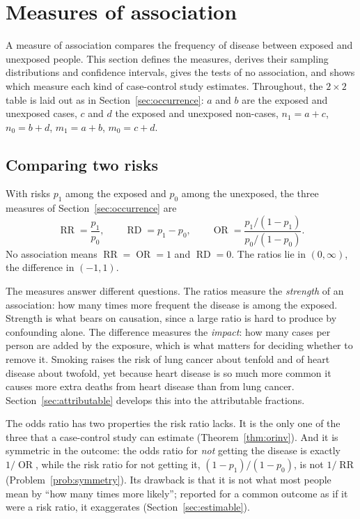 \documentclass[11pt,a4paper]{article}
\numberwithin{equation}{section}
\DeclareMathOperator{\OR}{OR}
\DeclareMathOperator{\RR}{RR}
\DeclareMathOperator{\RD}{RD}
\theoremstyle{definition}
\begin{document}
\section{Measures of association}
\label{sec:association}

A measure of association compares the frequency of disease between exposed and unexposed people. This section defines the measures,
derives their sampling distributions and confidence intervals, gives the tests of no association, and shows which measure each kind of
case-control study estimates. Throughout, the $2 \times 2$ table is laid out as in Section~\ref{sec:occurrence}: $a$ and $b$ are the exposed and
unexposed cases, $c$ and $d$ the exposed and unexposed non-cases, $n_1 = a + c$, $n_0 = b + d$, $m_1 = a + b$, $m_0 = c + d$.

\subsection{Comparing two risks}

With risks $p_1$ among the exposed and $p_0$ among the unexposed, the three measures of Section~\ref{sec:occurrence} are
\[
\RR = \frac{p_1}{p_0}, \qquad \RD = p_1 - p_0, \qquad \OR = \frac{p_1/(1 - p_1)}{p_0/(1 - p_0)} .
\]
No association means $\RR = \OR = 1$ and $\RD = 0$. The ratios lie in $(0, \infty)$, the difference in $(-1, 1)$.

The measures answer different questions. The ratios measure the \emph{strength} of an association: how many times more frequent the
disease is among the exposed. Strength is what bears on causation, since a large ratio is hard to produce by confounding alone. The
difference measures the \emph{impact}: how many cases per person are added by the exposure, which is what matters for deciding
whether to remove it. Smoking raises the risk of lung cancer about tenfold and of heart disease about twofold, yet because heart
disease is so much more common it causes more extra deaths from heart disease than from lung cancer. Section~\ref{sec:attributable}
develops this into the attributable fractions.

The odds ratio has two properties the risk ratio lacks. It is the only one of the three that a case-control study can estimate
(Theorem~\ref{thm:orinv}). And it is symmetric in the outcome: the odds ratio for \emph{not} getting the disease is exactly $1/\OR$, while the
risk ratio for not getting it, $(1 - p_1)/(1 - p_0)$, is not $1/\RR$ (Problem~\ref{prob:symmetry}). Its drawback is that it is not what most people
mean by ``how many times more likely''; reported for a common outcome as if it were a risk ratio, it exaggerates
(Section~\ref{sec:estimable}).
\end{document}
